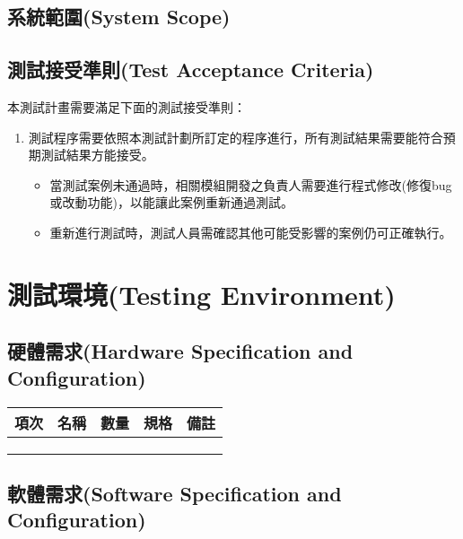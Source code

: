 \documentclass{article}
\begin{document}
\subsection[系統範圍(SYSTEM SCOPE)]{系統範圍(System Scope)}

\subsection[測試接受準則(TEST ACCEPTANCE CRITERIA)]{測試接受準則(Test Acceptance Criteria)}

本測試計畫需要滿足下面的測試接受準則：

\begin{enumerate}
	\color{blue}
	\item 測試程序需要依照本測試計劃所訂定的程序進行，所有測試結果需要能符合預期測試結果方能接受。
	      \begin{itemize}
		      \item 當測試案例未通過時，相關模組開發之負責人需要進行程式修改(修復bug或改動功能)，以能讓此案例重新通過測試。
		      \item 重新進行測試時，測試人員需確認其他可能受影響的案例仍可正確執行。
	      \end{itemize}
\end{enumerate}


\newpage

\section[測試環境(TESTING ENVIRONMENT)]{測試環境(Testing Environment)}

\subsection[硬體需求(HARDWARE SPECIFICATION AND CONFIGURATION)]{硬體需求(Hardware Specification and Configuration)}

\begin{tabularx}{\textwidth}{| c | C | c | C | M{0.15\textwidth} |}
	\hline
	項次 & 名稱 & 數量 & 規格 & 備註 \\ \hline
	   &    &    &    &    \\ \hline
	   &    &    &    &    \\ \hline
	   &    &    &    &    \\ \hline
\end{tabularx}

\subsection[軟體需求(SOFTWARE SPECIFICATION AND CONFIGURATION)]{軟體需求(Software Specification and Configuration)}
\end{document}

